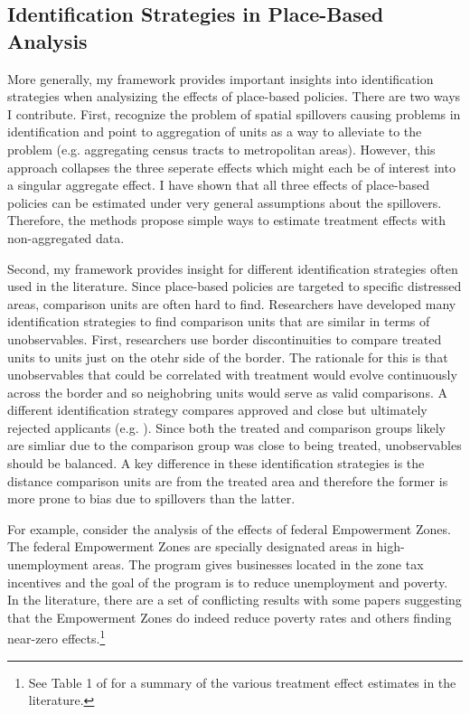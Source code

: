 \documentclass[11pt]{article}
\begin{document}
\subsection{Identification Strategies in Place-Based Analysis}

More generally, my framework provides important insights into identification strategies when analysizing the effects of place-based policies. There are two ways I contribute. First, \citet{Baum-Snow_Ferreira_2015} recognize the problem of spatial spillovers causing problems in identification and point to aggregation of units as a way to alleviate to the problem (e.g. aggregating census tracts to metropolitan areas). However, this approach collapses the three seperate effects which might each be of interest into a singular aggregate effect. I have shown that all three effects of place-based policies can be estimated under very general assumptions about the spillovers. Therefore, the methods propose simple ways to estimate treatment effects with non-aggregated data.

Second, my framework provides insight for different identification strategies often used in the literature. Since place-based policies are targeted to specific distressed areas, comparison units are often hard to find. Researchers have developed many identification strategies to find comparison units that are similar in terms of unobservables. First, researchers use border discontinuities to compare treated units to units just on the otehr side of the border. The rationale for this is that unobservables that could be correlated with treatment would evolve continuously across the border and so neighobring units would serve as valid comparisons. A different identification strategy compares approved and close but ultimately rejected applicants (e.g. \citet{}). Since both the treated and comparison groups likely are simliar due to the comparison group was close to being treated, unobservables should be balanced. A key difference in these identification strategies is the distance comparison units are from the treated area and therefore the former is more prone to bias due to spillovers than the latter.

For example, consider the analysis of the effects of federal Empowerment Zones. The federal Empowerment Zones are specially designated areas in high-unemployment areas. The program gives businesses located in the zone tax incentives and the goal of the program is to reduce unemployment and poverty. In the literature, there are a set of conflicting results with some papers suggesting that the Empowerment Zones do indeed reduce poverty rates and others finding near-zero effects.\footnote{See Table 1 of \citet{Neumark_Young_2019} for a summary of the various treatment effect estimates in the literature.} 
\end{document}
